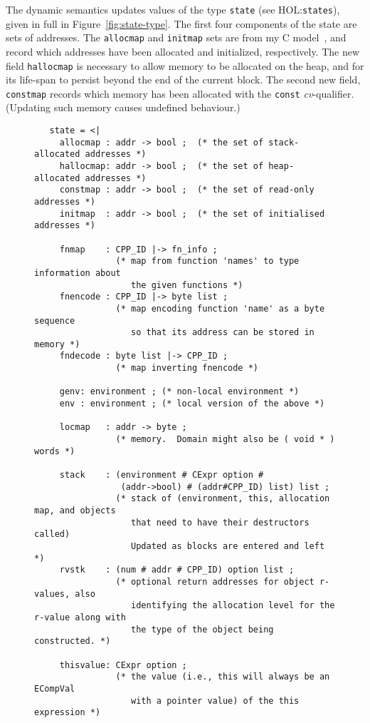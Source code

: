 \documentclass[11pt]{article}
\newcommand{\HOLfile}[1]{HOL:\texttt{#1}}
\begin{document}
The dynamic semantics updates values of the type \texttt{state} (see
\HOLfile{states}), given in full in Figure~\ref{fig:state-type}.  The
first four components of the state are sets of addresses.  The
\texttt{allocmap} and \texttt{initmap} sets are from my C
model~\cite{Norrish98}, and record which addresses have been allocated
and initialized, respectively.  The new field \texttt{hallocmap} is
necessary to allow memory to be allocated on the heap, and for its
life-span to persist beyond the end of the current block.  The second
new field, \texttt{constmap} records which memory has been allocated
with the \texttt{const} \emph{cv}-qualifier.  (Updating such memory
causes undefined behaviour.)

\begin{figure}[htbp]
\footnotesize
\begin{verbatim}
   state = <|
     allocmap : addr -> bool ;  (* the set of stack-allocated addresses *)
     hallocmap: addr -> bool ;  (* the set of heap-allocated addresses *)
     constmap : addr -> bool ;  (* the set of read-only addresses *)
     initmap  : addr -> bool ;  (* the set of initialised addresses *)

     fnmap    : CPP_ID |-> fn_info ;
                (* map from function 'names' to type information about
                   the given functions *)
     fnencode : CPP_ID |-> byte list ;
                (* map encoding function 'name' as a byte sequence
                   so that its address can be stored in memory *)
     fndecode : byte list |-> CPP_ID ;
                (* map inverting fnencode *)

     genv: environment ; (* non-local environment *)
     env : environment ; (* local version of the above *)

     locmap   : addr -> byte ;
                (* memory.  Domain might also be ( void * ) words *)

     stack    : (environment # CExpr option #
                 (addr->bool) # (addr#CPP_ID) list) list ;
                (* stack of (environment, this, allocation map, and objects
                   that need to have their destructors called)
                   Updated as blocks are entered and left *)
     rvstk    : (num # addr # CPP_ID) option list ;
                (* optional return addresses for object r-values, also
                   identifying the allocation level for the r-value along with
                   the type of the object being constructed. *)

     thisvalue: CExpr option ;
                (* the value (i.e., this will always be an ECompVal
                   with a pointer value) of the this expression *)


\end{verbatim}
\end{figure}
\end{document}
